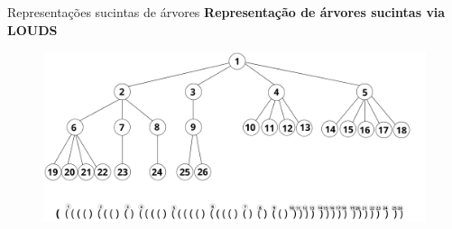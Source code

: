 \begin{frame}{Representações sucintas de árvores}
    \textbf{Representação de árvores sucintas via LOUDS}
        \begin{figure}[h!]
            \centering
            \includegraphics[scale=0.37]{images/louds.png}
        \end{figure} 
\end{frame}